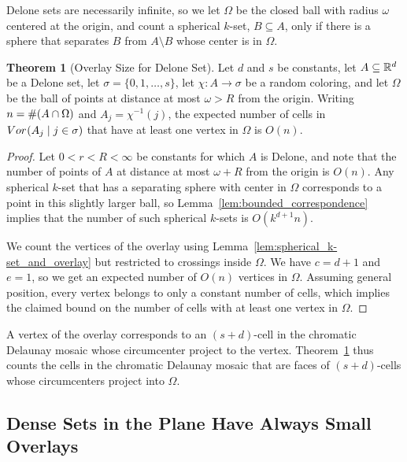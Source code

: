 \documentclass[a4paper]{article}
\newcommand {\mm}[1]   {\ifmmode{#1}\else{\mbox{\(#1\)}}\fi}
\newcommand{\Rspace}        {\mm{{\mathbb R}}}
\newcommand{\Overlay}[3]    {\mm{{\rm Vor}_{#1}{({#2}\mid{#3})}}}
\newcommand{\card}[1]       {\mm{{\#}{#1}}}
\theoremstyle{definition}
\newtheorem{theorem}{Theorem}
\numberwithin{theorem}{section}
\numberwithin{equation}{section}
\begin{document}
Delone sets are necessarily infinite, so we let $\Omega$ be the closed ball with radius $\omega$ centered at the origin, and count a spherical $k$-set, $B \subseteq A$, only if there is a sphere that separates $B$ from $A \setminus B$ whose center is in $\Omega$.
\begin{theorem}[Overlay Size for Delone Set]
  \label{thm:overlay_size_for_Delone_set}
  Let $d$ and $s$ be constants, let $A \subseteq \Rspace^d$ be a Delone set, let $\sigma = \{0,1,\ldots, s\}$, let $\chi \colon A \to \sigma$ be a random coloring, and let $\Omega$ be the ball of points at distance at most $\omega > R$ from the origin.
  Writing $n = \card{(A \cap \Omega)}$ and $A_j = \chi^{-1} (j)$, the expected number of cells in $\Overlay{}{A_j}{j \in \sigma}$ that have at least one vertex in $\Omega$ is $O(n)$.
\end{theorem}
\begin{proof}
  Let $0 < r < R < \infty$ be constants for which $A$ is Delone, and note that the number of points of $A$ at distance at most $\omega + R$ from the origin is $O(n)$.
  Any spherical $k$-set that has a separating sphere with center in $\Omega$ corresponds to a point in this slightly larger ball, so Lemma~\ref{lem:bounded_correspondence} implies that the number of such spherical $k$-sets is $O(k^{d+1} n)$.
  
  We count the vertices of the overlay using Lemma~\ref{lem:spherical_k-set_and_overlay} but restricted to crossings inside $\Omega$.
  We have $c = d+1$ and $e=1$, so we get an expected number of $O(n)$ vertices in $\Omega$.
  Assuming general position, every vertex belongs to only a constant number of cells, which implies the claimed bound on the number of cells with at least one vertex in $\Omega$.
\end{proof}

A vertex of the overlay corresponds to an $(s+d)$-cell in the chromatic Delaunay mosaic whose circumcenter project to the vertex.
Theorem~\ref{thm:overlay_size_for_Delone_set} thus counts the cells in the chromatic Delaunay mosaic that are faces of $(s+d)$-cells whose circumcenters project into $\Omega$.

\subsection{Dense Sets in the Plane Have Always Small Overlays}
\label{sec:4.3}
\end{document}
